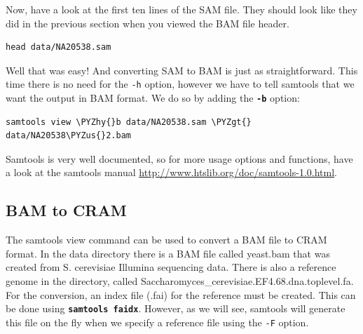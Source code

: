 \documentclass[11pt]{article}
\makeatletter
\def\PYZus{\char`\_}
\def\PYZgt{\char`\>}
\def\PYZhy{\char`\-}
\newcommand{\boxspacing}{\kern\kvtcb@left@rule\kern\kvtcb@boxsep}
\newcommand{\prompt}[4]{
        {\ttfamily\llap{{\color{#2}[#3]:\hspace{3pt}#4}}\vspace{-\baselineskip}}
    }
\makeatother
\begin{document}
    Now, have a look at the first ten lines of the SAM file. They should
look like they did in the previous section when you viewed the BAM file
header.

    \begin{tcolorbox}[breakable, size=fbox, boxrule=1pt, pad at break*=1mm,colback=cellbackground, colframe=cellborder]
\prompt{In}{incolor}{ }{\boxspacing}
\begin{Verbatim}[commandchars=\\\{\}]
head data/NA20538.sam
\end{Verbatim}
\end{tcolorbox}

    Well that was easy! And converting SAM to BAM is just as
straightforward. This time there is no need for the \texttt{-h} option,
however we have to tell samtools that we want the output in BAM format.
We do so by adding the \textbf{\texttt{-b}} option:

    \begin{tcolorbox}[breakable, size=fbox, boxrule=1pt, pad at break*=1mm,colback=cellbackground, colframe=cellborder]
\prompt{In}{incolor}{ }{\boxspacing}
\begin{Verbatim}[commandchars=\\\{\}]
samtools view \PYZhy{}b data/NA20538.sam \PYZgt{} data/NA20538\PYZus{}2.bam
\end{Verbatim}
\end{tcolorbox}

    Samtools is very well documented, so for more usage options and
functions, have a look at the samtools manual
\url{http://www.htslib.org/doc/samtools-1.0.html}.

    \hypertarget{bam-to-cram}{%
\subsection{BAM to CRAM}\label{bam-to-cram}}

The samtools view command can be used to convert a BAM file to CRAM
format. In the data directory there is a BAM file called yeast.bam that
was created from S. cerevisiae Illumina sequencing data. There is also a
reference genome in the directory, called
Saccharomyces\_cerevisiae.EF4.68.dna.toplevel.fa. For the conversion, an
index file (.fai) for the reference must be created. This can be done
using \textbf{\texttt{samtools\ faidx}}. However, as we will see,
samtools will generate this file on the fly when we specify a reference
file using the \texttt{-F} option.
\end{document}
